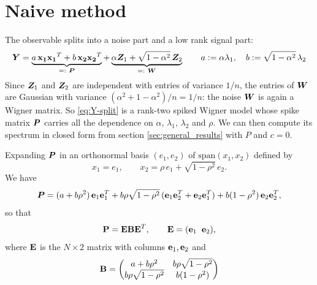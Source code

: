 \section{Naive method}\label{proof:naive}
The observable splits into a noise part and a low rank signal part:
\begin{equation}
    \rdmmat Y = \underbrace{a\,\vect{x_1}\vect{x_1}^T + b\,\vect{x_2}\vect{x_2}^T}_{=:\ \rdmmat P}
              + \underbrace{\alpha \rdmmat Z_1 + \sqrt{1-\alpha^2}\,\rdmmat Z_2}_{=:\ \rdmmat W}
    \qquad
    a := \alpha\lambda_1, \quad b := \sqrt{1-\alpha^2}\,\lambda_2
    \label{eq:Y-split}
\end{equation}
Since $\bm{Z}_1$ and $\bm{Z}_2$ are independent with entries of variance $1/n$, the entries of $\bm{W}$ are Gaussian with variance $(\alpha^2 + 1 - \alpha^2)/n = 1/n$: the noise $\bm{W}$ is again a Wigner matrix. So \eqref{eq:Y-split} is a rank-two spiked Wigner model whose spike matrix $\bm{P}$ carries all the dependence on $\alpha$, $\lambda_1$, $\lambda_2$ and $\rho$. We can then compute its spectrum in closed form from section \ref{sec:general_results} with $P$ and $c=0$.

Expanding $\bm{P}$ in an orthonormal basis $(e_1, e_2)$ of $\mathrm{span}(x_1, x_2)$ defined by
    \[
    x_1 = e_1, \qquad x_2 = \rho\, e_1 + \sqrt{1-\rho^2}\, e_2 .
    \]
    We have
    \[
    \bm{P} = (a + b\rho^2)\, \boldsymbol{\mathbf{e}}_1 \boldsymbol{\mathbf{e}}_1^T + b\rho\sqrt{1-\rho^2}\, ( \boldsymbol{\mathbf{e}}_1 \boldsymbol{\mathbf{e}}_2^T + \boldsymbol{\mathbf{e}}_2 \boldsymbol{\mathbf{e}}_1^T) + b(1-\rho^2)\, \boldsymbol{\mathbf{e}}_2 \boldsymbol{\mathbf{e}}_2^T ,
    \]
    so that
    \[
    \boldsymbol{\mathbf{P}} = \boldsymbol{\mathbf{E}} \boldsymbol{\mathbf{B}} \boldsymbol{\mathbf{E}}^T, \qquad \boldsymbol{\mathbf{E}} = (\boldsymbol{\mathbf{e}}_1 \;\; \boldsymbol{\mathbf{e}}_2),
    \]
    where $\boldsymbol{\mathbf{E}}$ is the $N \times 2$ matrix with columns $\boldsymbol{\mathbf{e}}_1, \boldsymbol{\mathbf{e}}_2$ and
    \[
    \boldsymbol{\mathbf{B}} = \begin{pmatrix} a + b\rho^2 & b\rho\sqrt{1-\rho^2} \\ b\rho\sqrt{1-\rho^2} & b(1-\rho^2) \end{pmatrix}
    \]

